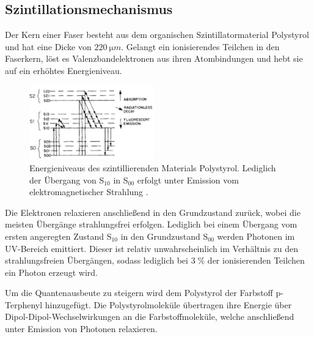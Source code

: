 \subsection{Szintillationsmechanismus}
Der Kern einer Faser besteht aus dem organischen Szintillatormaterial Polystyrol und hat eine Dicke von $\SI{220}{\micro m}$. Gelangt ein ionisierendes Teilchen in den Faserkern, löst es Valenzbandelektronen aus ihren Atombindungen und hebt sie auf ein erhöhtes Energieniveau.
\begin{figure}
  \includegraphics[width=0.48\textwidth]{plots/Energieniveaus.png}
  \caption{Energieniveaus des szintillierenden Materials Polystyrol. Lediglich der Übergang von S$_{10}$ in S$_{00}$ erfolgt unter Emission vom elektromagnetischer Strahlung \cite{anleitung}.}
  \label{fig:Niveaus}
\end{figure}
\FloatBarrier
Die Elektronen relaxieren anschließend in den Grundzustand zurück, wobei die meisten Übergänge strahlungsfrei erfolgen. Lediglich bei einem Übergang vom ersten angeregten Zustand S$_{10}$ in den Grundzustand S$_{00}$ werden Photonen im UV-Bereich emittiert. Dieser ist relativ unwahrscheinlich im Verhältnis zu den strahlungsfreien Übergängen, sodass lediglich bei 3$\;\%$ der ionisierenden Teilchen ein Photon erzeugt wird.

Um die Quantenausbeute zu steigern wird dem Polystyrol der Farbstoff p-Terphenyl hinzugefügt. Die Polystyrolmoleküle übertragen ihre Energie über Dipol-Dipol-Wechselwirkungen an die Farbstoffmoleküle, welche anschließend unter Emission von Photonen relaxieren.

